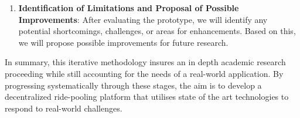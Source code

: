 \begin{enumerate}
    \item \textbf{Identification of Limitations and Proposal of Possible Improvements}:
After evaluating the prototype, we will identify any potential shortcomings, challenges, or areas for enhancements. Based on this, we will propose possible improvements for  future research.
\end{enumerate}

In summary, this iterative methodology insures an in depth academic research proceeding while still accounting for the needs of a real-world application. By progressing systematically through these stages, the aim is to develop a decentralized ride-pooling platform that utilises state of the art technologies to respond to real-world challenges.
